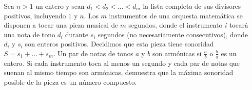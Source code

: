Sea $n>1$ un entero y sean $d_1\lt d_2\lt \dots\lt d_m$ la lista completa de sus divisores positivos, incluyendo $1$ y $n$. Los $m$ instrumentos de una orquesta matemática se disponen a tocar una pieza musical de $m$ segundos, donde el instrumento $i$ tocará una nota de tono $d_i$ durante $s_i$ segundos (no necesariamente consecutivos), donde $d_i$ y $s_i$ son enteros positivos. Decidimos que esta pieza tiene sonoridad $S=s_1+\dots+s_m$. Un par de notas de tonos $a$ y $b$ son armónicas si $\frac ab$ o $\frac ba$ es un entero. Si cada instrumento toca al menos un segundo y cada par de notas que suenan al mismo tiempo son armónicas, demuestra que la máxima sonoridad posible de la pieza es un número compuesto.